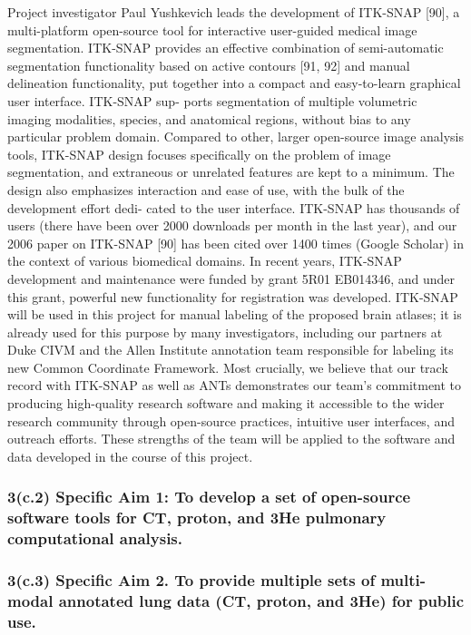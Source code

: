 \documentclass[11pt,]{article}
\begin{document}
Project investigator Paul Yushkevich leads the development of ITK-SNAP
{[}90{]}, a multi-platform open-source tool for interactive user-guided
medical image segmentation. ITK-SNAP provides an effective combination
of semi-automatic segmentation functionality based on active contours
{[}91, 92{]} and manual delineation functionality, put together into a
compact and easy-to-learn graphical user interface. ITK-SNAP sup- ports
segmentation of multiple volumetric imaging modalities, species, and
anatomical regions, without bias to any particular problem domain.
Compared to other, larger open-source image analysis tools, ITK-SNAP
design focuses specifically on the problem of image segmentation, and
extraneous or unrelated features are kept to a minimum. The design also
emphasizes interaction and ease of use, with the bulk of the development
effort dedi- cated to the user interface. ITK-SNAP has thousands of
users (there have been over 2000 downloads per month in the last year),
and our 2006 paper on ITK-SNAP {[}90{]} has been cited over 1400 times
(Google Scholar) in the context of various biomedical domains. In recent
years, ITK-SNAP development and maintenance were funded by grant 5R01
EB014346, and under this grant, powerful new functionality for
registration was developed. ITK-SNAP will be used in this project for
manual labeling of the proposed brain atlases; it is already used for
this purpose by many investigators, including our partners at Duke CIVM
and the Allen Institute annotation team responsible for labeling its new
Common Coordinate Framework. Most crucially, we believe that our track
record with ITK-SNAP as well as ANTs demonstrates our team's commitment
to producing high-quality research software and making it accessible to
the wider research community through open-source practices, intuitive
user interfaces, and outreach efforts. These strengths of the team will
be applied to the software and data developed in the course of this
project.

\subsubsection{3(c.2) \textbf{Specific Aim 1:} To develop a set of
open-source software tools for CT, proton, and 3He pulmonary
computational
analysis.}\label{c.2-specific-aim-1-to-develop-a-set-of-open-source-software-tools-for-ct-proton-and-3he-pulmonary-computational-analysis.}

\subsubsection{3(c.3) \textbf{Specific Aim 2.} To provide multiple sets
of multi-modal annotated lung data (CT, proton, and 3He) for public
use.}\label{c.3-specific-aim-2.-to-provide-multiple-sets-of-multi-modal-annotated-lung-data-ct-proton-and-3he-for-public-use.}
\end{document}
